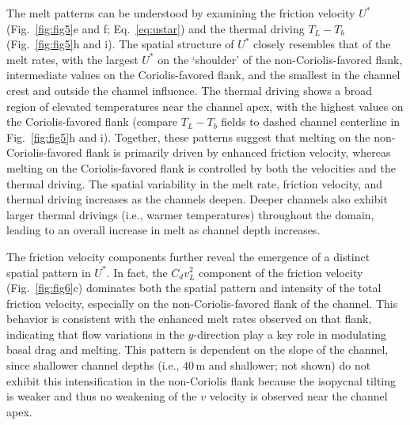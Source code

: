\documentclass[draft]{agujournal2019}
\begin{document}
The melt patterns can be understood by examining the friction velocity $U^*$ (Fig.~\ref{fig:fig5}e and f; Eq.~\ref{eq:ustar}) and the thermal driving $T_L-T_b$ (Fig.~\ref{fig:fig5}h and i). The spatial structure of $U^*$ closely resembles that of the melt rates, with the largest $U^*$ on the `shoulder' of the non-Coriolis-favored flank, intermediate values on the Coriolis-favored flank, and the smallest in the channel crest and outside the channel influence. The thermal driving shows a broad region of elevated temperatures near the channel apex, with the highest values on the Coriolis-favored flank (compare $T_L-T_b$ fields to dashed channel centerline in Fig.~\ref{fig:fig5}h and i). Together, these patterns suggest that melting on the non-Coriolis-favored flank is primarily driven by enhanced friction velocity, whereas melting on the Coriolis-favored flank is controlled by both the velocities and the thermal driving. The spatial variability in the melt rate, friction velocity, and thermal driving increases as the channels deepen. Deeper channels also exhibit larger thermal drivings (i.e., warmer temperatures) throughout the domain, leading to an overall increase in melt as channel depth increases.

The friction velocity components further reveal the emergence of a distinct spatial pattern in $U^*$. In fact, the $C_dv_L^2$ component of the friction velocity (Fig.~\ref{fig:fig6}c) dominates both the spatial pattern and intensity of the total friction velocity, especially on the non-Coriolis-favored flank of the channel. This behavior is consistent with the enhanced melt rates observed on that flank, indicating that flow variations in the $y$-direction play a key role in modulating basal drag and melting. This pattern is dependent on the slope of the channel, since shallower channel depths (i.e., $40\,\mathrm{m}$ and shallower; not shown) do not exhibit this intensification in the non-Coriolis flank because the isopycnal tilting is weaker and thus no weakening of the $v$ velocity is observed near the channel apex.
\end{document}
